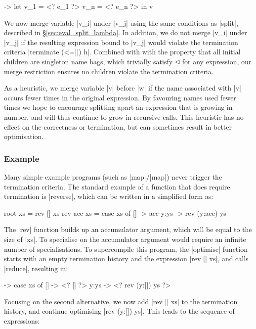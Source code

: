 \documentclass[draft]{sigplanconf}
\begin{document}
\begin{code}
\free ->  let  v_1 = <? e_1 ?>
               v_n = <? e_n ?>
          in   v
\end{code}

We now merge variable |v_i| under |v_j| using the same conditions as |split|, described in \S\ref{sec:eval_split_lambda}. In addition, we do not merge |v_i| under |v_j| if the resulting expression bound to |v_j| would violate the termination criteria |terminate (<=||) h|. Combined with with the property that all initial children are singleton name bags, which trivially satisfy $\unlhd$ for any expression, our merge restriction ensures no children violate the termination criteria.

As a heuristic, we merge variable |v| before |w| if the name associated with |v| occurs fewer times in the original expression. By favouring names used fewer times we hope to encourage splitting apart an expression that is growing in number, and will thus continue to grow in recursive calls. This heuristic has no effect on the correctness or termination, but can sometimes result in better optimisation.

\subsubsection{Example}
\label{sec:term_example}

Many simple example programs (such as |map|/|map|) never trigger the termination criteria. The standard example of a function that does require termination is |reverse|, which can be written in a simplified form as:

\begin{code}
root xs = rev [] xs
rev acc xs = case  xs of
                   []    -> acc
                   y:ys  -> rev (y:acc) ys
\end{code}

The |rev| function builds up an accumulator argument, which will be equal to the size of |xs|. To specialise on the accumulator argument would require an infinite number of specialisations. To supercompile this program, the |optimise| function starts with an empty termination history and the expression |rev [] xs|, and calls |reduce|, resulting in:

\begin{code}
\xs -> case  xs of
             []    -> <? [] ?>
             y:ys  -> <? rev (y:[]) ys ?>
\end{code}

Focusing on the second alternative, we now add |rev [] xs| to the termination history, and continue optimising |rev (y:[]) ys|. This leads to the sequence of expressions:
\end{document}
